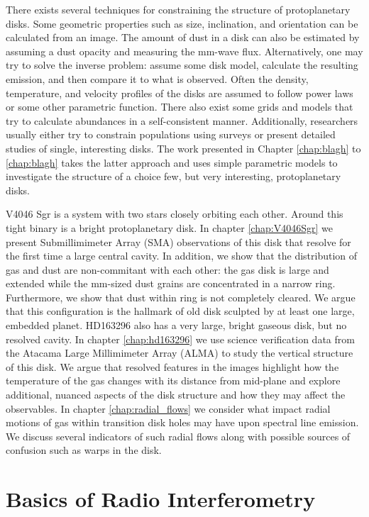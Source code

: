 There exists several techniques for constraining the structure of protoplanetary disks.  Some geometric 
properties such as size, inclination, and orientation can be calculated from an image.  The amount of dust 
in a disk can also be estimated by assuming a dust opacity and measuring the mm-wave flux.  Alternatively, one 
may try to solve the inverse problem: assume some disk model, calculate the resulting emission, and then compare
it to what is observed.  Often the density, temperature, and velocity profiles of the disks are assumed to 
follow power laws or some other parametric function.  There also exist some grids and models that try to 
calculate abundances in a self-consistent manner.  Additionally, researchers usually either try to constrain 
populations using 
surveys \citep[i.e.][]{andrews11,harris14} or present detailed studies of single, interesting disks.  The work
presented in Chapter \ref{chap:blagh} to \ref{chap:blagh} takes the latter approach and uses simple parametric 
models to investigate the structure of a choice few, but very interesting, protoplanetary disks.

V4046 Sgr is a system with two stars closely orbiting each other.  Around this tight binary is a bright
protoplanetary disk.  In chapter \ref{chap:V4046Sgr} we present Submillimimeter Array (SMA) observations of this 
disk 
that resolve for the
first time a large central cavity.  In addition, we show that the distribution of gas and dust are non-commitant 
with each other: the gas disk is large and extended while the mm-sized dust grains are concentrated in a narrow 
ring.  Furthermore, we show that dust within ring is not completely cleared.  We argue that this configuration is 
the hallmark of old disk sculpted by at least one large, embedded planet.  HD163296 also has a very large, bright gaseous disk, but no resolved cavity.  In chapter \ref{chap:hd163296} we 
use 
science verification data from the Atacama Large Millimimeter Array (ALMA) to study the vertical structure of 
this disk.  We argue that resolved features in the images highlight how the temperature of the gas changes with
its distance from mid-plane and explore additional, nuanced aspects of the disk structure and how they may 
affect the observables.   In chapter \ref{chap:radial_flows} we consider what impact radial motions of gas within transition disk 
holes may have upon spectral line emission.  We discuss several indicators of such radial flows along 
with possible sources of confusion such as warps in the disk.


\section{Basics of Radio Interferometry}
